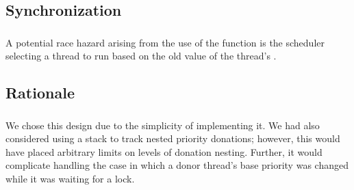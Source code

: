 \subsection{Synchronization}
	\subsubsection{}
		A potential race hazard arising from the use of the  function is the scheduler selecting a thread to run based on the old value of the thread's \epr. 
\subsection{Rationale}
	\subsubsection{}
		We chose this design due to the simplicity of implementing it. We had also considered using a stack to track nested priority donations; however, this would have placed arbitrary limits on levels of donation nesting. Further, it would complicate handling the case in which a donor thread's base priority was changed while it was waiting for a lock.